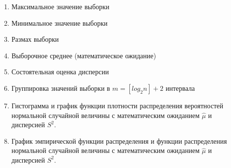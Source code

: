 \begin{enumerate}
	\item Максимальное значение выборки
	\item Минимальное значение выборки
	\item Размах выборки
	\item Выборочное среднее (математическое ожидание)
	\item Состоятельная оценка дисперсии
	\item Группировка значений выборки в $m = [log_2 n] + 2$ интервала
	
	\clearpage
	\item Гистограмма и график функции плотности распределения вероятностей нормальной случайной величины с математическим ожиданием $\hat \mu$ и дисперсией $S^2$. 
	
	
	\item График эмпирической функции распределения и функции распределения нормальной случайной величины с математическим ожиданием $\hat \mu$ и дисперсией $S^2$. 
	
	
\end{enumerate}